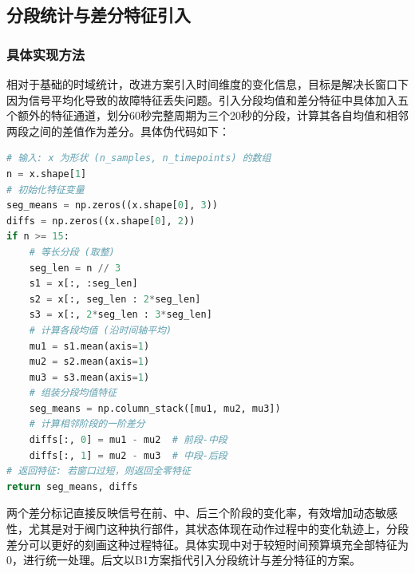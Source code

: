 \documentclass[12pt, a4paper]{ctexart}
\begin{document}
\subsection{分段统计与差分特征引入}
\subsubsection{具体实现方法}
相对于基础的时域统计，改进方案引入时间维度的变化信息，目标是解决长窗口下因为信号平均化导致的故障特征丢失问题。引入分段均值和差分特征中具体加入五个额外的特征通道，划分60秒完整周期为三个20秒的分段，计算其各自均值和相邻两段之间的差值作为差分。具体伪代码如下：
\begin{lstlisting}[language=Python, caption={分段均值与差分特征计算逻辑}]
# 输入: x 为形状 (n_samples, n_timepoints) 的数组
n = x.shape[1]
# 初始化特征变量
seg_means = np.zeros((x.shape[0], 3))
diffs = np.zeros((x.shape[0], 2))
if n >= 15:
    # 等长分段 (取整)
    seg_len = n // 3
    s1 = x[:, :seg_len]
    s2 = x[:, seg_len : 2*seg_len]
    s3 = x[:, 2*seg_len : 3*seg_len]
    # 计算各段均值 (沿时间轴平均)
    mu1 = s1.mean(axis=1)
    mu2 = s2.mean(axis=1)
    mu3 = s3.mean(axis=1)
    # 组装分段均值特征
    seg_means = np.column_stack([mu1, mu2, mu3])
    # 计算相邻阶段的一阶差分
    diffs[:, 0] = mu1 - mu2  # 前段-中段
    diffs[:, 1] = mu2 - mu3  # 中段-后段
# 返回特征: 若窗口过短，则返回全零特征
return seg_means, diffs
\end{lstlisting}
两个差分标记直接反映信号在前、中、后三个阶段的变化率，有效增加动态敏感性，尤其是对于阀门这种执行部件，其状态体现在动作过程中的变化轨迹上，分段差分可以更好的刻画这种过程特征。具体实现中对于较短时间预算填充全部特征为0，进行统一处理。后文以B1方案指代引入分段统计与差分特征的方案。
\end{document}

